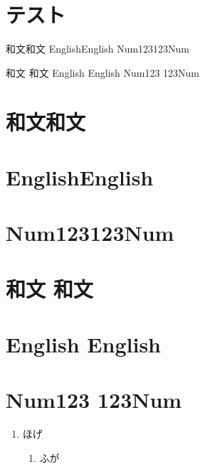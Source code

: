 \documentclass{article}
\begin{document}
\tableofcontents
\section{テスト}
和文和文
EnglishEnglish
Num123123Num\par
和文  和文
English  English
Num123  123Num
\section{和文和文}
\section{EnglishEnglish}
\section{Num123123Num}
\section{和文  和文}
\section{English  English}
\section{Num123  123Num}

\bigskip
\renewcommand{\theenumi}{\Kanji{enumi}}
\begin{enumerate}
\item ほげ
\begin{enumerate}
\item ふが
\end{enumerate}
\end{enumerate}
\end{document}

